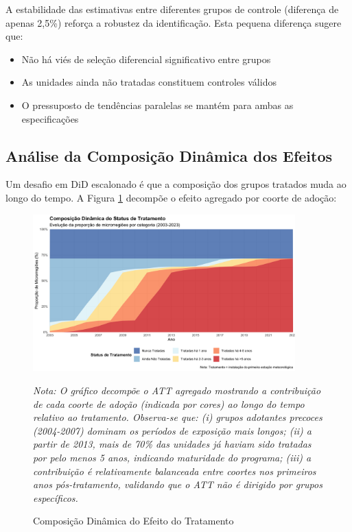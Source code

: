 \documentclass[
	12pt,				%
	oneside,			%
	a4paper,			%
	english,			%
	french,				%
	spanish,			%
	brazil				%
	]{abntex2}
\begin{document}
A estabilidade das estimativas entre diferentes grupos de controle (diferença de apenas 2,5\%) reforça a robustez da identificação. Esta pequena diferença sugere que:
\begin{itemize}
\item Não há viés de seleção diferencial significativo entre grupos
\item As unidades ainda não tratadas constituem controles válidos
\item O pressuposto de tendências paralelas se mantém para ambas as especificações
\end{itemize}

\subsection{Análise da Composição Dinâmica dos Efeitos}

Um desafio em DiD escalonado é que a composição dos grupos tratados muda ao longo do tempo. A Figura \ref{fig:composition} decompõe o efeito agregado por coorte de adoção:

\begin{figure}[htbp]
\centering
\caption{Composição Dinâmica do Efeito do Tratamento}
\label{fig:composition}
\includegraphics[width=0.9\textwidth]{../../../data/outputs/additional_figures/treatment_composition_dynamic.png}

\textit{Nota: O gráfico decompõe o ATT agregado mostrando a contribuição de cada coorte de adoção (indicada por cores) ao longo do tempo relativo ao tratamento. Observa-se que: (i) grupos adotantes precoces (2004-2007) dominam os períodos de exposição mais longos; (ii) a partir de 2013, mais de 70\% das unidades já haviam sido tratadas por pelo menos 5 anos, indicando maturidade do programa; (iii) a contribuição é relativamente balanceada entre coortes nos primeiros anos pós-tratamento, validando que o ATT não é dirigido por grupos específicos.}
\end{figure}
\end{document}
